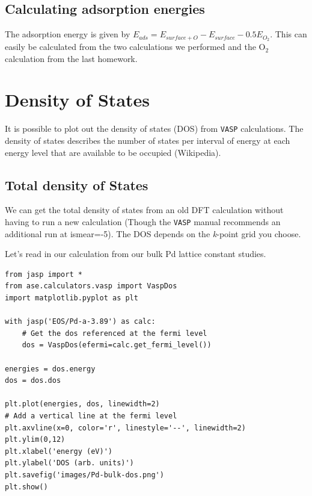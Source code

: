 \documentclass[11pt]{article}
\begin{document}
\subsection{Calculating adsorption energies}
\label{sec-3-4}

The adsorption energy is given by $E_{ads} = E_{surface+O} - E_{surface} - 0.5 E_{O_{2}}$. This can easily be calculated from the two calculations we performed and the O$_{\text{2}}$ calculation from the last homework.


\section{Density of States}
\label{sec-4}

It is possible to plot out the density of states (DOS) from \texttt{VASP} calculations. The density of states describes the number of states per interval of energy at each energy level that are available to be occupied (Wikipedia). 

\subsection{Total density of States}
\label{sec-4-1}

We can get the total density of states from an old DFT calculation without having to run a new calculation (Though the \texttt{VASP} manual recommends an additional run at ismear=-5). The DOS depends on the \emph{k}-point grid you choose.


Let's read in our calculation from our bulk Pd lattice constant studies.

\begin{verbatim}
from jasp import *
from ase.calculators.vasp import VaspDos
import matplotlib.pyplot as plt

with jasp('EOS/Pd-a-3.89') as calc:
    # Get the dos referenced at the fermi level
    dos = VaspDos(efermi=calc.get_fermi_level())
  
energies = dos.energy
dos = dos.dos

plt.plot(energies, dos, linewidth=2)
# Add a vertical line at the fermi level
plt.axvline(x=0, color='r', linestyle='--', linewidth=2)
plt.ylim(0,12)
plt.xlabel('energy (eV)')
plt.ylabel('DOS (arb. units)')
plt.savefig('images/Pd-bulk-dos.png')
plt.show()
\end{verbatim}
\end{document}
